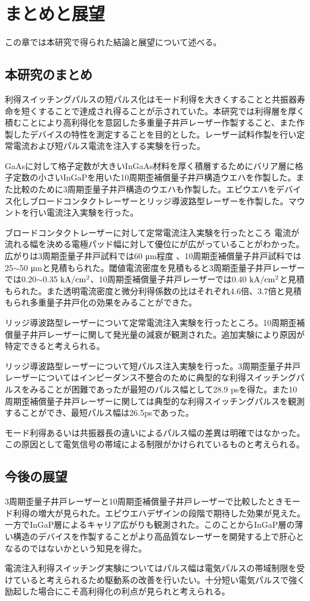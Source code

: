 
\chapter{まとめと展望}
この章では本研究で得られた結論と展望について述べる。
\section{本研究のまとめ}%
利得スイッチングパルスの短パルス化はモード利得を大きくすることと共振器寿命を短くすることで達成され得ることが示されていた。本研究では利得層を厚く積むことにより高利得化を意図した多重量子井戸レーザー作製すること、また作製したデバイスの特性を測定することを目的とした。レーザー試料作製を行い定常電流および短パルス電流を注入する実験を行った。

GaAsに対して格子定数が大きいInGaAs材料を厚く積層するためにバリア層に格子定数の小さいInGaPを用いた10周期歪補償量子井戸構造ウエハを作製した。また比較のために3周期歪量子井戸構造のウエハも作製した。エピウエハをデバイス化しブロードコンタクトレーザーとリッジ導波路型レーザーを作製した。マウントを行い電流注入実験を行った。

ブロードコンタクトレーザーに対して定常電流注入実験を行ったところ
電流が流れる幅を決める電極パッド幅に対して優位にが広がっていることがわかった。広がりは3周期歪量子井戸試料では60 \si{\micro\metre}程度
、10周期歪補償量子井戸試料では25$\sim$50 \si{\micro\metre}と見積もられた。閾値電流密度を見積もると3周期歪量子井戸レーザーでは0.20$\sim$0.35 $\rm{kA/cm^{2}}$、10周期歪補償量子井戸レーザーでは0.40 $\rm{kA/cm^2}$と見積もられた。また透明電流密度と微分利得係数の比はそれぞれ4.6倍、3.7倍と見積もられ多重量子井戸化の効果をみることができた。

リッジ導波路型レーザーについて定常電流注入実験を行ったところ。10周期歪補償量子井戸レーザーに関して発光量の減衰が観測された。追加実験により原因が特定できると考えられる。


リッジ導波路型レーザーについて短パルス注入実験を行った。3周期歪量子井戸レーザーについてはインピーダンス不整合のために典型的な利得スイッチングパルスをみることが困難であったが最短のパルス幅として28.9 psを得た。また10周期歪補償量子井戸レーザーに関しては典型的な利得スイッチングパルスを観測することができ、最短パルス幅は26.5psであった。

モード利得あるいは共振器長の違いによるパルス幅の差異は明確ではなかった。この原因として電気信号の帯域による制限がかけられているものと考えられる。

\section{今後の展望}
3周期歪量子井戸レーザーと10周期歪補償量子井戸レーザーで比較したときモード利得の増大が見られた。エピウエハデザインの段階で期待した効果が見えた。一方でInGaP層によるキャリア広がりも観測された。このことからInGaP層の薄い構造のデバイスを作製することがより高品質なレーザーを開発する上で肝心となるのではないかという知見を得た。


電流注入利得スイッチング実験についてはパルス幅は電気パルスの帯域制限を受けていると考えられるため駆動系の改善を行いたい。十分短い電気パルスで強く励起した場合にこそ高利得化の利点が見られと考えられる。